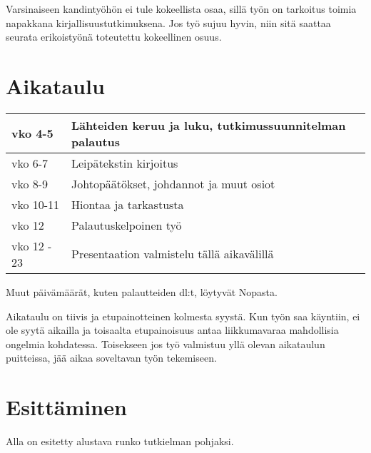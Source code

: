 \documentclass[12pt,a4paper,finnish,oneside]{article}
\begin{document}
Varsinaiseen kandintyöhön ei tule kokeellista osaa, sillä työn on tarkoitus
toimia napakkana kirjallisuustutkimuksena. Jos työ sujuu hyvin, niin sitä
saattaa seurata erikoistyönä toteutettu kokeellinen osuus.

\section{Aikataulu}

\begin{tabular}{|p{30mm}|p{120mm}|}
\hline
vko 4-5   & Lähteiden keruu ja luku, tutkimussuunnitelman palautus \\ \hline
vko 6-7   & Leipätekstin kirjoitus \\ \hline
vko 8-9   & Johtopäätökset, johdannot ja muut osiot \\ \hline
vko 10-11 & Hiontaa ja tarkastusta \\ \hline
vko 12    & Palautuskelpoinen työ \\ \hline
vko 12 - 23 & Presentaation valmistelu tällä aikavälillä \\ \hline
\end{tabular}

Muut päivämäärät, kuten palautteiden dl:t, löytyvät Nopasta.

Aikataulu on tiivis ja etupainotteinen kolmesta syystä. Kun työn saa käyntiin,
ei ole syytä aikailla ja toisaalta etupainoisuus antaa liikkumavaraa mahdollisia
ongelmia kohdatessa. Toisekseen jos työ valmistuu yllä olevan aikataulun
puitteissa, jää aikaa soveltavan työn tekemiseen.

\section{Esittäminen}

Alla on esitetty alustava runko tutkielman pohjaksi.
\end{document}
